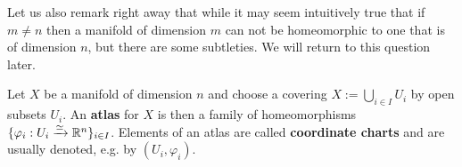         Let us also remark right away that while it may seem intuitively true that if $m \not = n$ then a manifold of dimension $m$ can not be homeomorphic to one that is of dimension $n$, but there are some subtleties. We will return to this question later.

        \begin{definition} \label{def: atlases_and_charts}
            Let $X$ be a manifold of dimension $n$ and choose a covering $X := \bigcup_{i \in I} U_i$ by open subsets $U_i$. An \textbf{atlas} for $X$ is then a family of homeomorphisms $\{ \varphi_i: U_i \xrightarrow[]{\simeq} \mathbb{R}^n \}_{i \in I}$. Elements of an atlas are called \textbf{coordinate charts} and are usually denoted, e.g. by $(U_i, \varphi_i)$.
        \end{definition}
        
